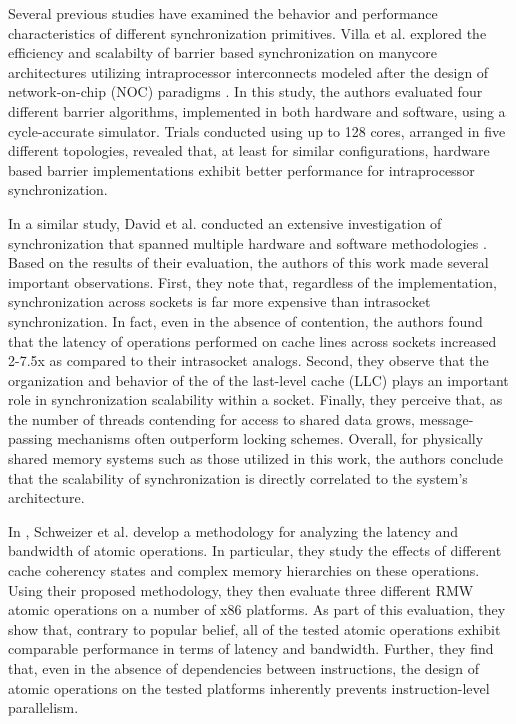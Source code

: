 

Several previous studies have examined the behavior and performance characteristics of different synchronization primitives.
Villa et al. explored the efficiency and scalabilty of barrier based synchronization on manycore architectures utilizing intraprocessor interconnects modeled after the design of network-on-chip (NOC) paradigms \cite{villa2008barriers}.
In this study, the authors evaluated four different barrier algorithms, implemented in both hardware and software, using a cycle-accurate simulator.
Trials conducted using up to 128 cores, arranged in five different topologies, revealed that, at least for similar configurations, hardware based barrier implementations exhibit better performance for intraprocessor synchronization.

In a similar study, David et al. conducted an extensive investigation of synchronization that spanned multiple hardware and software methodologies \cite{david2013sync}.
Based on the results of their evaluation, the authors of this work made several important observations.
First, they note that, regardless of the implementation, synchronization across sockets is far more expensive than intrasocket synchronization.
In fact, even in the absence of contention, the authors found that the latency of operations performed on cache lines across sockets increased 2-7.5x as compared to their intrasocket analogs.
Second, they observe that the organization and behavior of the of the last-level cache (LLC) plays an important role in synchronization scalability within a socket.
Finally, they perceive that, as the number of threads contending for access to shared data grows, message-passing mechanisms often outperform locking schemes.
Overall, for physically shared memory systems such as those utilized in this work, the authors conclude that the scalability of synchronization is directly correlated to the system's architecture.

In \cite{schweizer2015evaluating}, Schweizer et al. develop a methodology for analyzing the latency and bandwidth of atomic operations.
In particular, they study the effects of different cache coherency states and complex memory hierarchies on these operations.
Using their proposed methodology, they then evaluate three different RMW atomic operations on a number of x86 platforms.
As part of this evaluation, they show that, contrary to popular belief, all of the tested atomic operations exhibit comparable performance in terms of latency and bandwidth.
Further, they find that, even in the absence of dependencies between instructions, the design of atomic operations on the tested platforms inherently prevents instruction-level parallelism.

